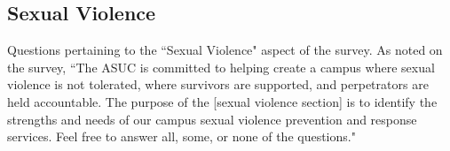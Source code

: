 \documentclass{article}\usepackage[]{graphicx}\usepackage[]{color}
\begin{document}
\subsection{Sexual Violence}
Questions pertaining to the ``Sexual Violence" aspect of the survey. As noted on the survey, ``The ASUC is committed to helping create a campus where sexual violence is not
tolerated, where survivors are supported, and perpetrators are held accountable.
The purpose of the [sexual violence section] is to identify the strengths and needs of our campus sexual violence prevention and response services. Feel free to answer all, some,
or none of the questions."
\begin{table}[H]
\centering
{}
\end{table}
\end{document}
